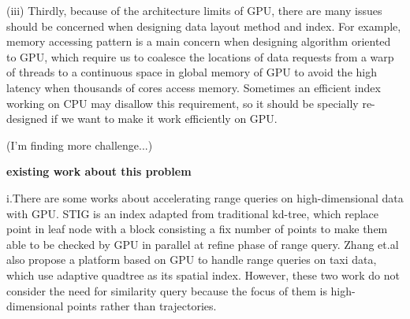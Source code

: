 \documentclass[conference]{IEEEtran}
\begin{document}
	(iii) Thirdly, because of the architecture limits of GPU, there are many issues should be concerned when designing data layout method and index\cite{7498315}. For example, memory accessing pattern is a main concern when designing algorithm oriented to GPU, which require us to coalesce the locations of data requests from a warp of threads to a continuous space in global memory of GPU to avoid the high latency when thousands of cores access memory. Sometimes an efficient index working on CPU may disallow this requirement, so it should be specially re-designed if we want to make it work efficiently on GPU.
	
	
	(I'm finding more challenge...)
	
	
\textbf{existing work about this problem}
	
	
	i.There are some works about accelerating range queries on high-dimensional data with GPU. STIG\cite{7498315} is an index adapted from traditional kd-tree, which replace point in leaf node with a block consisting a fix number of points to make them able to be checked by GPU in parallel at refine phase of range query. Zhang et.al\cite{GPUTaxi} also propose a platform based on GPU to handle range queries on taxi data, which use adaptive quadtree as its spatial index. However, these two work do not consider the need for similarity query because the focus of them is high-dimensional points rather than trajectories. 
	
\end{document}
